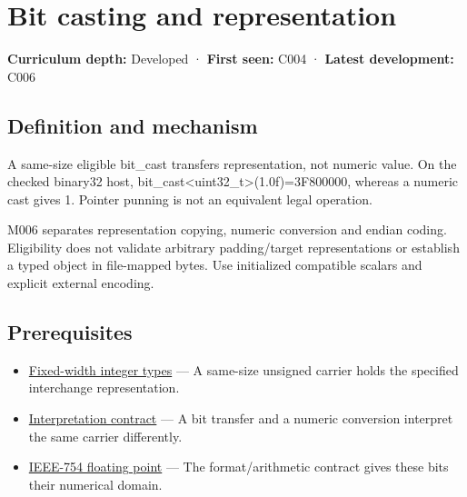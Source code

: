 \hypertarget{appendix-34ee45f161c1}{}\label{referencestart:appendix-34ee45f161c1}
\section{Bit casting and representation}\label{appendix-34ee45f161c1-bit-casting-and-representation}

\textbf{Curriculum depth:} Developed · \textbf{First seen:} C004 · \textbf{Latest development:} C006

\begin{allmightroledefinition}

\subsection{Definition and mechanism}\label{appendix-34ee45f161c1-definition-and-mechanism}

A same-size eligible bit\_cast transfers representation, not numeric value. On the checked binary32 host, bit\_cast\textless uint32\_t\textgreater{}(1.0f)=3F800000, whereas a numeric cast gives 1. Pointer punning is not an equivalent legal operation.

\end{allmightroledefinition}

M006 separates representation copying, numeric conversion and endian coding. Eligibility does not validate arbitrary padding/target representations or establish a typed object in file-mapped bytes. Use initialized compatible scalars and explicit external encoding.

\subsection{Prerequisites}\label{appendix-34ee45f161c1-prerequisites}

\begin{itemize}
\tightlist
\item
  \hyperref[appendix-cc04044b5782]{Fixed-width integer types} --- A same-size unsigned carrier holds the specified interchange representation.
\item
  \hyperref[appendix-f414bd4ed05c]{Interpretation contract} --- A bit transfer and a numeric conversion interpret the same carrier differently.
\item
  \hyperref[appendix-343615f49ddf]{IEEE-754 floating point} --- The format/arithmetic contract gives these bits their numerical domain.
\end{itemize}

